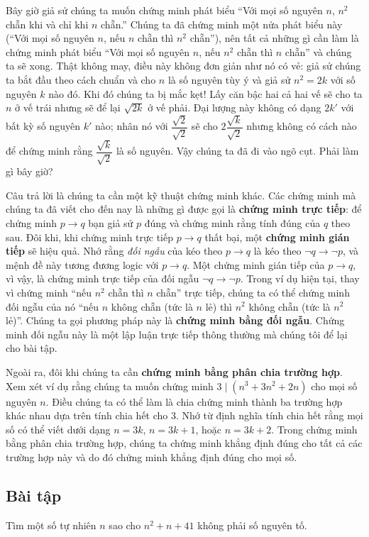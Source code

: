 Bây giờ giả sử chúng ta muốn chứng minh phát biểu ``Với mọi số nguyên $n$, $n^2$ chẵn khi và chỉ khi $n$ chẵn.'' Chúng ta đã chứng minh một nửa phát biểu này (``Với mọi số nguyên $n$, nếu $n$ chẵn thì $n^2$ chẵn''), nên tất cả những gì cần làm là chứng minh phát biểu ``Với mọi số nguyên $n$, nếu $n^2$ chẵn thì $n$ chẵn'' và chúng ta sẽ xong. Thật không may, điều này không đơn giản như nó có vẻ: giả sử chúng ta bắt đầu theo cách chuẩn và cho $n$ là số nguyên tùy ý và giả sử $n^2 = 2k$ với số nguyên $k$ nào đó. Khi đó chúng ta bị mắc kẹt! Lấy căn bậc hai cả hai vế sẽ cho ta $n$ ở vế trái nhưng sẽ để lại $\sqrt{2k}$ ở vế phải. Đại lượng này không có dạng $2k'$ với bất kỳ số nguyên $k'$ nào; nhân nó với $\dfrac{\sqrt{2}}{\sqrt{2}}$ sẽ cho $2\dfrac{\sqrt{k}}{\sqrt{2}}$ nhưng không có cách nào để chứng minh rằng $\dfrac{\sqrt{k}}{\sqrt{2}}$ là số nguyên. Vậy chúng ta đã đi vào ngõ cụt. Phải làm gì bây giờ?

Câu trả lời là chúng ta cần một kỹ thuật chứng minh khác. Các chứng minh mà chúng ta đã viết cho đến nay là những gì được gọi là \textbf{chứng minh trực tiếp}: để chứng minh $p \to q$ bạn giả sử $p$ đúng và chứng minh rằng tính đúng của $q$ theo sau. Đôi khi, khi chứng minh trực tiếp $p \to q$ thất bại, một \textbf{chứng minh gián tiếp} sẽ hiệu quả. Nhớ rằng \emph{đối ngẫu} của kéo theo $p \to q$ là kéo theo $\neg q \to \neg p$, và mệnh đề này tương đương logic với $p \to q$. Một chứng minh gián tiếp của $p \to q$, vì vậy, là chứng minh trực tiếp của đối ngẫu $\neg q \to \neg p$. Trong ví dụ hiện tại, thay vì chứng minh ``nếu $n^2$ chẵn thì $n$ chẵn'' trực tiếp, chúng ta có thể chứng minh đối ngẫu của nó ``nếu $n$ không chẵn (tức là $n$ lẻ) thì $n^2$ không chẵn (tức là $n^2$ lẻ)''. Chúng ta gọi phương pháp này là \textbf{chứng minh bằng đối ngẫu}. Chứng minh đối ngẫu này là một lập luận trực tiếp thông thường mà chúng tôi để lại cho bài tập.

Ngoài ra, đôi khi chúng ta cần \textbf{chứng minh bằng phân chia trường hợp}. Xem xét ví dụ rằng chúng ta muốn chứng minh $3 \mid (n^3 + 3n^2 + 2n)$ cho mọi số nguyên $n$. Điều chúng ta có thể làm là chia chứng minh thành ba trường hợp khác nhau dựa trên tính chia hết cho $3$. Nhớ từ định nghĩa tính chia hết rằng mọi số có thể viết dưới dạng $n = 3k$, $n = 3k + 1$, hoặc $n = 3k + 2$. Trong chứng minh bằng phân chia trường hợp, chúng ta chứng minh khẳng định đúng cho tất cả các trường hợp này và do đó chứng minh khẳng định đúng cho mọi số.

\subsection*{Bài tập}
\begin{exercise}
Tìm một số tự nhiên $n$ sao cho $n^2 + n + 41$ không phải số nguyên tố.
\end{exercise}

